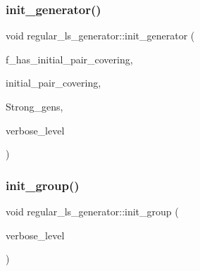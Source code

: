 \subsubsection{\texorpdfstring{init\+\_\+generator()}{init\_generator()}}
{\footnotesize\ttfamily void regular\+\_\+ls\+\_\+generator\+::init\+\_\+generator (\begin{DoxyParamCaption}\item[{\mbox{\hyperlink{galois_8h_a09fddde158a3a20bd2dcadb609de11dc}{I\+NT}}}]{f\+\_\+has\+\_\+initial\+\_\+pair\+\_\+covering,  }\item[{\mbox{\hyperlink{galois_8h_a09fddde158a3a20bd2dcadb609de11dc}{I\+NT}} $\ast$}]{initial\+\_\+pair\+\_\+covering,  }\item[{\mbox{\hyperlink{classstrong__generators}{strong\+\_\+generators}} $\ast$}]{Strong\+\_\+gens,  }\item[{\mbox{\hyperlink{galois_8h_a09fddde158a3a20bd2dcadb609de11dc}{I\+NT}}}]{verbose\+\_\+level }\end{DoxyParamCaption})}

\mbox{\label{classregular__ls__generator_a6fabc31cfdaa11bccf11d4076265fe51}} 
\subsubsection{\texorpdfstring{init\+\_\+group()}{init\_group()}}
{\footnotesize\ttfamily void regular\+\_\+ls\+\_\+generator\+::init\+\_\+group (\begin{DoxyParamCaption}\item[{\mbox{\hyperlink{galois_8h_a09fddde158a3a20bd2dcadb609de11dc}{I\+NT}}}]{verbose\+\_\+level }\end{DoxyParamCaption})}

\mbox{\label{classregular__ls__generator_a5d4a720722a5db9aa0bb151b785db5e5}} 
